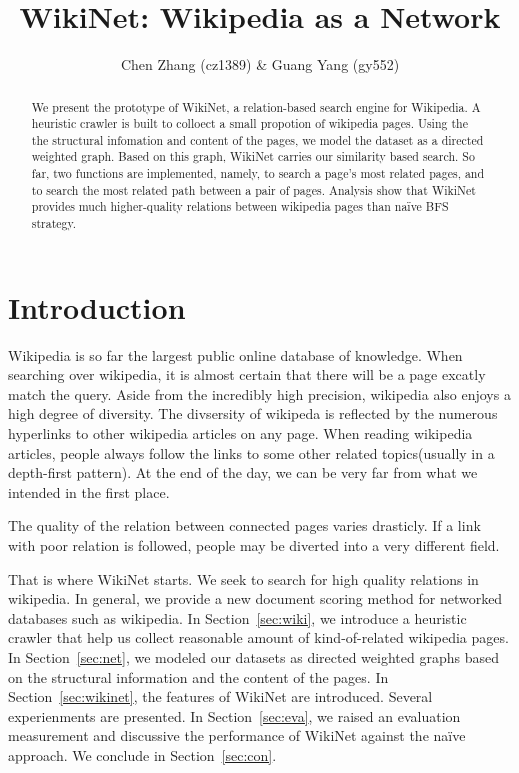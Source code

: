 \documentclass[12pt]{amsart}
\title{WikiNet: Wikipedia as a Network}
\author{Chen Zhang (cz1389) \& Guang Yang (gy552)}
\newcommand{\0}{\mat{0}}
\newcommand{\1}{\mathds{1}}
\begin{document}
\begin{abstract}
We present the prototype of WikiNet, a relation-based search engine for Wikipedia. A heuristic crawler is built to colloect a small propotion of wikipedia pages. Using the the structural infomation and content of the pages, we model the dataset as a directed weighted graph. Based on this graph, WikiNet carries our similarity based search. So far, two functions are implemented, namely, to search a page's most related pages, and to search the  most related path between a pair of pages. Analysis show that WikiNet provides much higher-quality relations between wikipedia pages than na\"ive BFS strategy. 
\end{abstract}

\maketitle

\section{Introduction}

Wikipedia is so far the largest public online database of knowledge. 
When searching over wikipedia, it is almost certain that there will be a page excatly match the query. 
Aside from the incredibly high precision, wikipedia also enjoys a high degree of diversity. The divsersity of wikipeda is reflected by the numerous hyperlinks to other wikipedia articles on any page. 
When reading wikipedia articles, people always follow the links to some other related topics(usually in a depth-first pattern). 
At the end of the day, we can be very far from what we intended in the first place. 

The quality of the relation between connected pages varies drasticly. If a link with poor relation is followed, people may be diverted into a very different field. 

That is where WikiNet starts. We seek to search for high quality relations in wikipedia. In general, we provide a new document scoring method for networked databases such as wikipedia. 
In Section~\ref{sec:wiki}, we introduce a heuristic crawler that help us collect reasonable amount of kind-of-related wikipedia pages. 
In Section~\ref{sec:net}, we modeled our datasets as directed weighted graphs based on the structural information and the content of the pages. 
In Section~\ref{sec:wikinet}, the features of WikiNet are introduced. Several experienments are presented. 
In Section~\ref{sec:eva}, we raised an evaluation measurement and discussive the performance of WikiNet against the na\"ive approach. 
We conclude in Section~\ref{sec:con}. 
\end{document}
